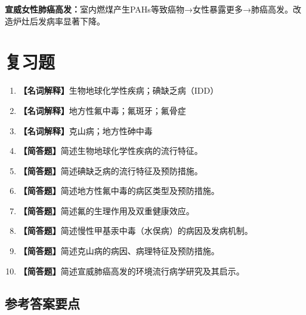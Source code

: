 \begin{tipbox}
\textbf{宣威女性肺癌高发：}室内燃煤产生PAHs等致癌物→女性暴露更多→肺癌高发。改造炉灶后发病率显著下降。
\end{tipbox}

\section{复习题}

\begin{enumerate}[leftmargin=*, itemsep=8pt]
    \item \textbf{【名词解释】}生物地球化学性疾病；碘缺乏病（IDD）
    \item \textbf{【名词解释】}地方性氟中毒；氟斑牙；氟骨症
    \item \textbf{【名词解释】}克山病；地方性砷中毒
    \item \textbf{【简答题】}简述生物地球化学性疾病的流行特征。
    \item \textbf{【简答题】}简述碘缺乏病的流行特征及预防措施。
    \item \textbf{【简答题】}简述地方性氟中毒的病区类型及预防措施。
    \item \textbf{【简答题】}简述氟的生理作用及双重健康效应。
    \item \textbf{【简答题】}简述慢性甲基汞中毒（水俣病）的病因及发病机制。
    \item \textbf{【简答题】}简述克山病的病因、病理特征及预防措施。
    \item \textbf{【简答题】}简述宣威肺癌高发的环境流行病学研究及其启示。
\end{enumerate}

\subsection*{参考答案要点}

